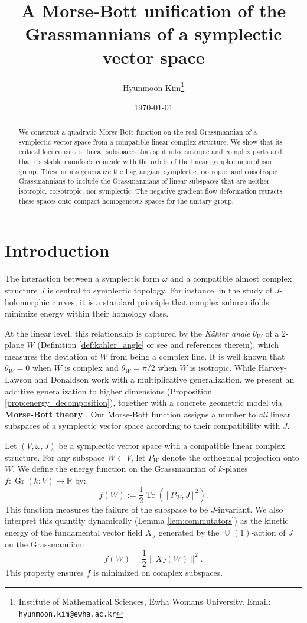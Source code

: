 \documentclass[12pt, final]{article}
\title{A Morse-Bott unification of the Grassmannians of a symplectic vector space}
\author{Hyunmoon Kim\thanks{Institute of Mathematical Sciences, Ewha Womans University. Email: \texttt{hyunmoon.kim@ewha.ac.kr}}}
\date{\today}
\def\R{\mathbb{R}}
\def\U{\operatorname{U}}
\def\Gr{\operatorname{Gr}}
\def\Tr{\operatorname{Tr}}
\begin{document}
\maketitle

\begin{abstract}
We construct a quadratic Morse-Bott function on the real Grassmannian of a symplectic vector space from a compatible linear complex structure. We show that its critical loci consist of linear subspaces that split into isotropic and complex parts and that its stable manifolds coincide with the orbits of the linear symplectomorphism group. These orbits generalize the Lagrangian, symplectic, isotropic, and coisotropic Grassmannians to include the Grassmannians of linear subspaces that are neither isotropic, coisotropic, nor symplectic. The negative gradient flow deformation retracts these spaces onto compact homogeneous spaces for the unitary group.
\end{abstract}

\section{Introduction}

The interaction between a symplectic form $\omega$ and a compatible almost complex structure $J$ is central to symplectic topology. For instance, in the study of $J$-holomorphic curves, it is a standard principle that complex submanifolds minimize energy within their homology class.

At the linear level, this relationship is captured by the \textit{Kähler angle} $\theta_W$ of a $2$-plane $W$ (Definition \ref{def:kahler_angle} or see \cite{Scharnhorst} and references therein), which measures the deviation of $W$ from being a complex line. It is well known that $\theta_W = 0$ when $W$ is complex and $\theta_W = \pi/2$ when $W$ is isotropic. While Harvey-Lawson \cite{HarveyLawson} and Donaldson \cite{Donaldson} work with a multiplicative generalization, we present an additive generalization to higher dimensions (Proposition \ref{prop:energy_decomposition}), together with a concrete geometric model via \textbf{Morse-Bott theory} \cite{Bott, AustinBraam}. Our Morse-Bott function assigns a number to \textit{all} linear subspaces of a symplectic vector space according to their compatibility with $J$.

Let $(V, \omega, J)$ be a symplectic vector space with a compatible linear complex structure. For any subspace $W \subset V$, let $P_W$ denote the orthogonal projection onto $W$. We define the energy function on the Grassmannian of $k$-planes $f: \Gr(k; V) \to \R$ by:
\begin{equation}
    f(W) := \frac{1}{2} \Tr([P_W, J]^2).
\end{equation}
This function measures the failure of the subspace to be $J$-invariant. We also interpret this quantity dynamically (Lemma \ref{lem:commutators}) as the kinetic energy of the fundamental vector field $X_J$ generated by the $\U(1)$-action of $J$ on the Grassmannian:
\begin{equation}
    f(W) = \frac{1}{2} \| X_J(W) \|^2.
\end{equation}
This property ensures $f$ is minimized on complex subspaces.
\end{document}
